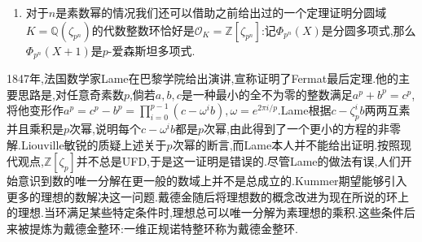 \begin{enumerate}
\begin{proof}
		带入$T=\alpha$,就得到:$f'(\alpha)=p^{n-1}\alpha^{p^{n-1}-1}\sum_{i=1}^{p-1}\xi_p^{i-1}i$,但是按照我们计算的$\xi_p$的判别式,得到$\mathrm{N}(\sum_{i=1}^{p-1}\xi_p^{i-1}i)=(-1)^{\frac{p(p-1)}{2}}p^{p-2}$.整理得到判别式为$(-1)^{p^{n-1}(p-1)}p^{p^{n-1}(np-n-1)}$.
		
		再证一般情况,为此我们来对$n$的不同素因子个数做归纳.假设$K=\mathbb{Q}(\zeta_n)$,其中$n=p_1^{n_1}p_2^{n_2}$,其中$p_1$和$p_2$是两个不同素数,并且$n_1,n_2\ge1$.取$K_1=\mathbb{Q}(\zeta_{p_1^{n_1}})$和$K_2=\mathbb{Q}(\zeta_{p_2^{n_2}})$.于是有$K_1K_2=\mathbb{Q}(\zeta_{p_1^{n_1}},\zeta_{p_2^{n_2}})=\mathbb{Q}(\zeta_n)=K$.另外按照素数幂的情况,有$d(K_1)=(-1)^{p_1^{n_1}/2}p_1^{(p_1^{n_1}-1)/(p_1-1)}$和$d(K_2)=(-1)^{p_2^{n_1}/2}p_2^{(p_2^{n_2}-1)/(p_2-1)}$,它们是互素的整数,于是引理的条件全部满足,于是$\mathscr{O}_K=\mathscr{O}_{K_1}\mathscr{O}_{K_2}=\mathbb{Z}[\zeta_{p_1^{n_1}},\zeta_{p_2^{n_2}}]=\mathbb{Z}[\zeta_n]$,它的一组整基为$\{1,\zeta_n,\cdots,\zeta_n^{\varphi(n)-1}\}$,它的判别式为:
		$$(d(K_1))^{\varphi(p_2^{n_2})}(d(K_2))^{\varphi(p_1^{n_1})}=(-1)^{\varphi(n)/2}p_1^{\varphi(n)/(p_1-1)}p_2^{\varphi(n)/(p_2-1)}$$
	\end{proof}
    \item 对于$n$是素数幂的情况我们还可以借助之前给出过的一个定理证明分圆域$K=\mathbb{Q}(\zeta_{p^n})$的代数整数环恰好是$\mathscr{O}_K=\mathbb{Z}[\zeta_{p^n}]$:记$\Phi_{p^n}(X)$是分圆多项式,那么$\Phi_{p^n}(X+1)$是$p$-爱森斯坦多项式.
\end{enumerate}

1847年,法国数学家Lame在巴黎学院给出演讲,宣称证明了Fermat最后定理.他的主要思路是,对任意奇素数$p$,倘若$a,b,c$是一种最小的全不为零的整数满足$a^p+b^p=c^p$,将他变形作$a^p=c^p-b^p=\prod_{i=0}^{p-1}(c-\omega^ib),\omega=e^{2\pi i/p}$.Lame根据$c-\zeta_p^ib$两两互素并且乘积是$p$次幂,说明每个$c-\omega^ib$都是$p$次幂,由此得到了一个更小的方程的非零解.Liouville敏锐的质疑上述关于$p$次幂的断言,而Lame本人并不能给出证明.按照现代观点,$\mathbb{Z}[\zeta_p]$并不总是UFD,于是这一证明是错误的.尽管Lame的做法有误,人们开始意识到数的唯一分解在更一般的数域上并不是总成立的.Kummer期望能够引入更多的理想的数解决这一问题.戴德金随后将理想数的概念改进为现在所说的环上的理想.当环满足某些特定条件时,理想总可以唯一分解为素理想的乘积.这些条件后来被提炼为戴德金整环:一维正规诺特整环称为戴德金整环.

